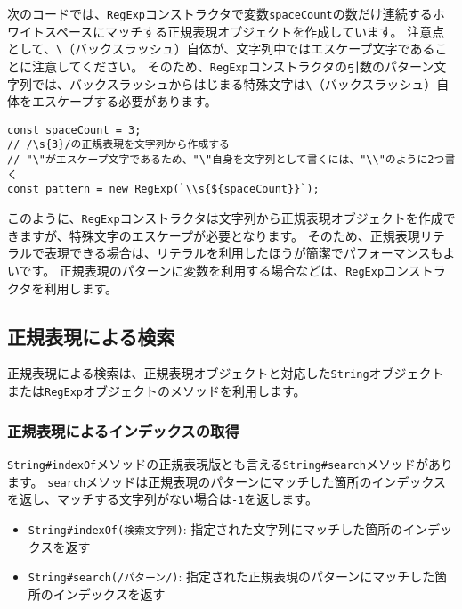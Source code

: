 次のコードでは、\texttt{RegExp}コンストラクタで変数\texttt{spaceCount}の数だけ連続するホワイトスペースにマッチする正規表現オブジェクトを作成しています。
注意点として、\texttt{\textbackslash}（バックスラッシュ）自体が、文字列中ではエスケープ文字であることに注意してください。
そのため、\texttt{RegExp}コンストラクタの引数のパターン文字列では、バックスラッシュからはじまる特殊文字は\texttt{\textbackslash}（バックスラッシュ）自体をエスケープする必要があります。

\begin{lstlisting}
const spaceCount = 3;
// /\s{3}/の正規表現を文字列から作成する
// "\"がエスケープ文字であるため、"\"自身を文字列として書くには、"\\"のように2つ書く
const pattern = new RegExp(`\\s{${spaceCount}}`);
\end{lstlisting}

このように、\texttt{RegExp}コンストラクタは文字列から正規表現オブジェクトを作成できますが、特殊文字のエスケープが必要となります。
そのため、正規表現リテラルで表現できる場合は、リテラルを利用したほうが簡潔でパフォーマンスもよいです。
正規表現のパターンに変数を利用する場合などは、\texttt{RegExp}コンストラクタを利用します。

\hypertarget{search-by-regexp}{%
\subsection{正規表現による検索}\label{search-by-regexp}}

正規表現による検索は、正規表現オブジェクトと対応した\texttt{String}オブジェクトまたは\texttt{RegExp}オブジェクトのメソッドを利用します。

\hypertarget{search-index-by-regexp}{%
\subsubsection{正規表現によるインデックスの取得}\label{search-index-by-regexp}}

\texttt{String\#indexOf}メソッドの正規表現版とも言える\texttt{String\#search}メソッドがあります。
\texttt{search}メソッドは正規表現のパターンにマッチした箇所のインデックスを返し、マッチする文字列がない場合は\texttt{-1}を返します。

\begin{itemize}
\item
  \texttt{String\#indexOf(検索文字列)}:
  指定された文字列にマッチした箇所のインデックスを返す
\item
  \texttt{String\#search(/パターン/)}:
  指定された正規表現のパターンにマッチした箇所のインデックスを返す
\end{itemize}

